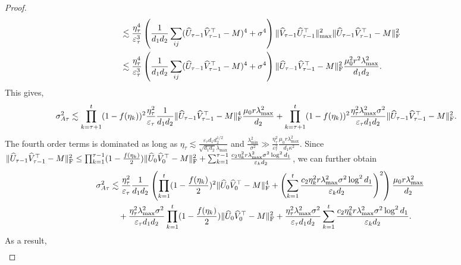 \documentclass[12pt]{article}
\newcommand\fro[1]{\| #1 \|_{\rm{F}}}
\theoremstyle{plain}
\begin{document}
\begin{proof}
\begin{align*}
        &\lesssim \frac{\eta_{\tau}^4}{\varepsilon_{\tau}^3}\left(\frac{1}{d_1d_2}\sum_{ij}(\widehat{U}_{\tau-1}\widehat{V}_{\tau-1}^{\top} - M)^4 + \sigma^4\right)\|\widehat{V}_{\tau-1}\widehat{U}_{\tau-1}^{\top}\|_{\max}^2\fro{\widehat{U}_{\tau-1}\widehat{V}_{\tau-1}^{\top} - M}^2 \\
        &\lesssim \frac{\eta_{\tau}^4}{\varepsilon_{\tau}^3}\left(\frac{1}{d_1d_2}\sum_{ij}(\widehat{U}_{\tau-1}\widehat{V}_{\tau-1}^{\top} - M)^4 + \sigma^4\right)\fro{\widehat{U}_{\tau-1}\widehat{V}_{\tau-1}^{\top} - M}^2\frac{\mu_0^2r^2\lambda_{\max}^2}{d_1d_2}.
    \end{align*}
    This gives,
    \begin{align*}
        \sigma_{A\tau}^2&\lesssim \prod_{k=\tau+1}^{t} (1-f(\eta_k))^2\frac{\eta_{\tau}^2}{\varepsilon_{\tau}}\frac{1}{d_1d_2}\fro{\widehat{U}_{\tau-1}\widehat{V}_{\tau-1}^{\top} - M}^4\frac{\mu_0r\lambda_{\max}^2}{d_2} + \prod_{k=\tau+1}^{t} (1-f(\eta_k))^2\frac{\eta_{\tau}^2\lambda_{\max}^2\sigma^2}{\varepsilon_{\tau} d_1d_2}\fro{\widehat{U}_{\tau-1}\widehat{V}_{\tau-1}^{\top} - M}^2.
    \end{align*}
    The fourth order terms is dominated as long as $\eta_{\tau}\lesssim \frac{\varepsilon_{\tau}d_1d_2^{1/2}}{\sqrt{d_1d_2}\lambda_{\max}}$ and $\frac{\lambda_{\min}^2}{\sigma^2}\gg \frac{\eta_{\tau}^2}{\varepsilon_{\tau}^2}\frac{\mu_0r\lambda_{\max}^2}{d_1\kappa^2}$. Since $\fro{\widehat{U}_{\tau-1}\widehat{V}_{\tau-1}^{\top} - M}^2\leq \prod_{k=1}^{\tau-1}(1-\frac{f(\eta_{k})}{2}) \fro{\widehat{U}_0\widehat{V}_0^{\top} - M}^2 + \sum_{k=1}^{\tau-1}\frac{c_2\eta_k^2r\lambda_{\max}^2\sigma^2\log^2d_1}{\varepsilon_kd_2}$, we can further obtain
    \begin{align*}
        \sigma_{A\tau}^2&\lesssim \frac{\eta_{\tau}^2}{\varepsilon_{\tau}}\frac{1}{d_1d_2}\left(\prod_{k=1}^{t}(1-\frac{f(\eta_{k})}{2})^2 \fro{\widehat{U}_{0}\widehat{V}_{0}^{\top} - M}^4 + \left(\sum_{k=1}^{t}\frac{c_2\eta_k^2r\lambda_{\max}^2\sigma^2\log^2d_1}{\varepsilon_kd_2}\right)^2\right)\frac{\mu_0r\lambda_{\max}^2}{d_2} \\ &\quad +  \frac{\eta_{\tau}^2\lambda_{\max}^2\sigma^2}{\varepsilon_{\tau} d_1d_2}  \prod_{k=1}^{t}(1-\frac{f(\eta_{k})}{2})\fro{\widehat{U}_{0}\widehat{V}_{0}^{\top} - M}^2 + \frac{\eta_{\tau}^2\lambda_{\max}^2\sigma^2}{\varepsilon_{\tau} d_1d_2}\sum_{k=1}^{t}\frac{c_2\eta_k^2r\lambda_{\max}^2\sigma^2\log^2d_1}{\varepsilon_kd_2}.
    \end{align*}
    As a result, 
    \begin{align*}

\end{align*}
\end{proof}
\end{document}
